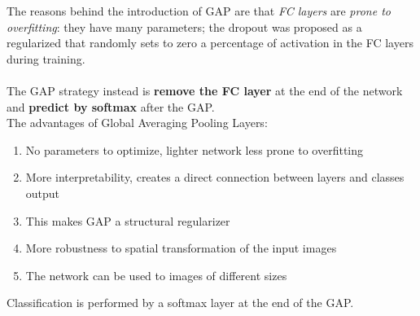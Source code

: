 The reasons behind the introduction of GAP are that \textit{FC layers} are \textit{prone to overfitting}: they have many parameters; the dropout was proposed as a regularized that randomly sets to zero a percentage of activation in the FC layers during training. \\ \\
The GAP strategy instead is \textbf{remove the FC layer} at the end of the network and \textbf{predict by softmax} after the GAP. \\
The advantages of Global Averaging Pooling Layers:
\begin{enumerate}
    \item No parameters to optimize, lighter network less prone to overfitting
    \item More interpretability, creates a direct connection between layers and classes output
    \item This makes GAP a structural regularizer
    \item More robustness to spatial transformation of the input images
    \item The network can be used to images of different sizes
\end{enumerate}{}
Classification is performed by a softmax layer at the end of the GAP.



